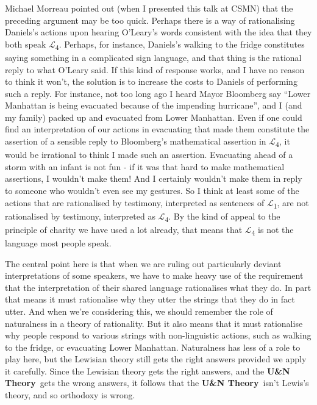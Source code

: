 \documentclass[
  10pt,
  letterpaper,
  DIV=11,
  numbers=noendperiod,
  twoside]{scrartcl}
\begin{document}
Michael Morreau pointed out (when I presented this talk at CSMN) that
the preceding argument may be too quick. Perhaps there is a way of
rationalising Daniels's actions upon hearing O'Leary's words consistent
with the idea that they both speak \(\mathcal{L}\)\textsubscript{4}.
Perhaps, for instance, Daniels's walking to the fridge constitutes
saying something in a complicated sign language, and that thing is the
rational reply to what O'Leary said. If this kind of response works, and
I have no reason to think it won't, the solution is to increase the
costs to Daniels of performing such a reply. For instance, not too long
ago I heard Mayor Bloomberg say ``Lower Manhattan is being evacuated
because of the impending hurricane'', and I (and my family) packed up
and evacuated from Lower Manhattan. Even if one could find an
interpretation of our actions in evacuating that made them constitute
the assertion of a sensible reply to Bloomberg's mathematical assertion
in \(\mathcal{L}\)\textsubscript{4}, it would be irrational to think I
made such an assertion. Evacuating ahead of a storm with an infant is
not fun - if it was that hard to make mathematical assertions, I
wouldn't make them! And I certainly wouldn't make them in reply to
someone who wouldn't even see my gestures. So I think at least some of
the actions that are rationalised by testimony, interpreted as sentences
of \(\mathcal{L}\)\textsubscript{1}, are not rationalised by testimony,
interpreted as \(\mathcal{L}\)\textsubscript{4}. By the kind of appeal
to the principle of charity we have used a lot already, that means that
\(\mathcal{L}\)\textsubscript{4} is not the language most people speak.

The central point here is that when we are ruling out particularly
deviant interpretations of some speakers, we have to make heavy use of
the requirement that the interpretation of their shared language
rationalises what they do. In part that means it must rationalise why
they utter the strings that they do in fact utter. And when we're
considering this, we should remember the role of naturalness in a theory
of rationality. But it also means that it must rationalise why people
respond to various strings with non-linguistic actions, such as walking
to the fridge, or evacuating Lower Manhattan. Naturalness has less of a
role to play here, but the Lewisian theory still gets the right answers
provided we apply it carefully. Since the Lewisian theory gets the right
answers, and the \textbf{U\&N Theory}~gets the wrong answers, it follows
that the \textbf{U\&N Theory}~isn't Lewis's theory, and so orthodoxy is
wrong.
\end{document}
